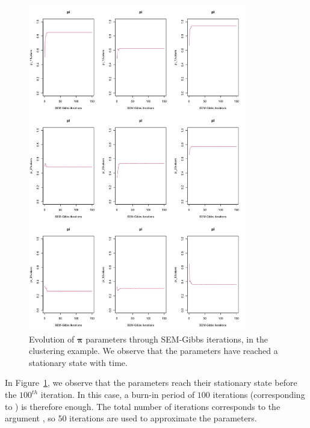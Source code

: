 
\begin{figure}[ht!]
\centering
  \includegraphics[width = 0.85\textwidth]{images/params-pi-evolution.png}
    \caption{Evolution of $\boldsymbol\pi$ parameters through SEM-Gibbs iterations, in the clustering example. We observe that the parameters have reached a stationary state with time.}
    \label{fig:conv}
\end{figure}
In Figure~\ref{fig:conv}, we observe that the parameters reach their stationary state before the $100^{th}$ iteration. In this case, a burn-in period of $100$ iterations (corresponding to ) is therefore enough. The total number of iterations corresponds to the argument , so $50$ iterations are used to approximate the parameters.

